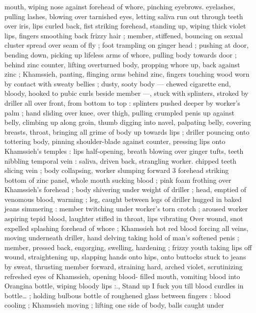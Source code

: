 mouth, wiping nose against forehead of whore, pinching eyebrows. 
eyelashes, pulling lashes, blowing over tarnished eyes, letting saliva 
run out through teeth over iris, lips curled back, fist striking 
forehead, standing up, wiping thick violet lips, fingers smoothing 
back frizzy hair ; member, stiffened, bouncing on sexual cluster 
spread over seam of fly ; foot trampling on ginger head ; pushing at 
door, bending down, picking up lifeless arms of whore, pulling body 
towards door ; behind zinc counter, lifting overturned body, propping 
whore up, back against zinc ; Khamssieh, panting, flinging arms 
behind zinc, fingers touching wood worn by contact with sweaty 
bellies ; dusty, sooty body --- chewed cigarette end, bloody, hooked 
to pubic curls beside member ---, stuck with splinters, stroked by 
driller all over front, from bottom to top : splinters pushed deeper by 
worker's palm ; hand sliding over knee, over thigh, pulling crumpled 
penis up against belly, climbing up along groin, thumb digging into 
navel, palpating belly, covering breasts, throat, bringing all grime of 
body up towards lips ; driller pouncing onto tottering body, pinning 
shoulder-blade against counter, pressing lips onto Khamssieh's 
temples : lips half-opening, breath blowing over ginger tufts, teeth 
nibbling temporal vein : saliva, driven back, strangling worker. 
chipped teeth slicing vein ; body collapsing, worker slumping forward 
3 forehead striking bottom of zinc panel, whole mouth sucking blood 
; pink foam frothing over Khamssieh's forehead ; body shivering 
under weight of driller ; head, emptied of venomous blood, warming 
; leg, caught between legs of driller hugged in baked jeans 
simmering : member twitching under worker's torn crotch ; aroused 
worker aspiring tepid blood, laughter stifled in throat, lips vibrating 
Over wound, snot expelled splashing forehead of whore ; Khamssieh 
hot red blood forcing all veins, moving underneath driller, hand 
delving taking hold of man's softened penis ; member, pressed back, 
engorging, swelling, hardening ; frizzy youth taking lips off wound, 
straightening up, slapping hands onto hips, onto buttocks stuck to 
jeans by sweat, thrusting member forward, straining hard, arched 
violet, scrutinizing refreshed eyes of Khamssieh, opening blood- 
filled mouth, vomiting blood into Orangina bottle, wiping bloody lips 
:{\gl}., Stand up{\td} I fuck you till blood curdles in bottle{\ldots} ; holding 
bulbous bottle of roughened glass between fingers : blood cooling ; 
Khamssieh moving ; lifting one side of body, balls caught under 
